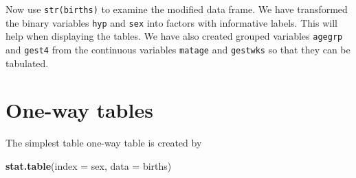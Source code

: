 \documentclass[
]{book}
\newenvironment{Shaded}{\begin{snugshade}}{\end{snugshade}}
\newcommand{\AttributeTok}[1]{\textcolor[rgb]{0.13,0.29,0.53}{#1}}
\newcommand{\ConstantTok}[1]{\textcolor[rgb]{0.56,0.35,0.01}{#1}}
\newcommand{\DecValTok}[1]{\textcolor[rgb]{0.00,0.00,0.81}{#1}}
\newcommand{\FunctionTok}[1]{\textcolor[rgb]{0.13,0.29,0.53}{\textbf{#1}}}
\newcommand{\NormalTok}[1]{#1}
\newcommand{\OtherTok}[1]{\textcolor[rgb]{0.56,0.35,0.01}{#1}}
\newcommand{\SpecialCharTok}[1]{\textcolor[rgb]{0.81,0.36,0.00}{\textbf{#1}}}
\newcommand{\StringTok}[1]{\textcolor[rgb]{0.31,0.60,0.02}{#1}}
\begin{document}
\begin{Shaded}
\end{Shaded}

Now use \texttt{str(births)} to examine the modified data frame. We have
transformed the binary variables \texttt{hyp} and \texttt{sex} into factors
with informative labels. This will help when displaying the tables. We
have also created grouped variables \texttt{agegrp} and \texttt{gest4} from
the continuous variables \texttt{matage} and \texttt{gestwks} so that they
can be tabulated.

\section{One-way tables}\label{one-way-tables}

The simplest table one-way table is created by

\begin{Shaded}
\begin{Highlighting}[]
\FunctionTok{stat.table}\NormalTok{(}\AttributeTok{index =}\NormalTok{ sex, }\AttributeTok{data =}\NormalTok{ births)}
\end{Highlighting}
\end{Shaded}
\end{document}
